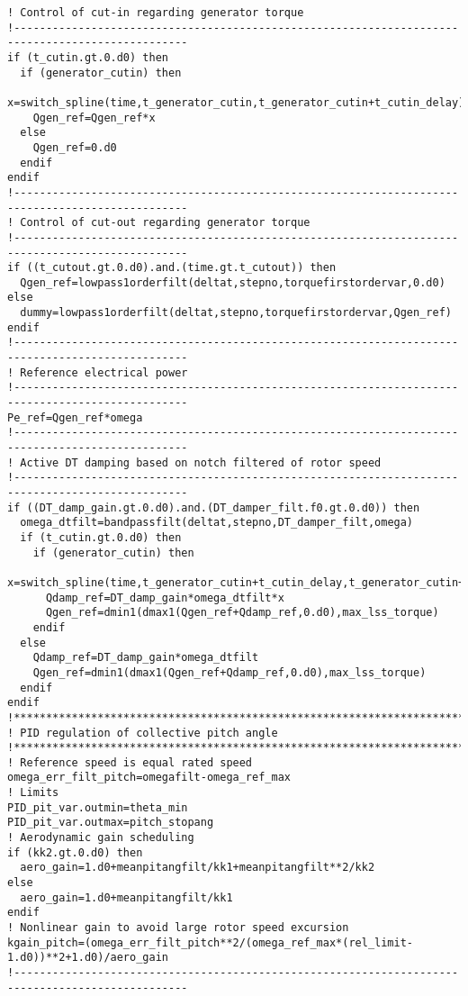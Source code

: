 {\begin{verbatim}
! Control of cut-in regarding generator torque
!-------------------------------------------------------------------------------------------------
if (t_cutin.gt.0.d0) then
  if (generator_cutin) then
    x=switch_spline(time,t_generator_cutin,t_generator_cutin+t_cutin_delay)
    Qgen_ref=Qgen_ref*x
  else
    Qgen_ref=0.d0
  endif
endif
!-------------------------------------------------------------------------------------------------
! Control of cut-out regarding generator torque
!-------------------------------------------------------------------------------------------------
if ((t_cutout.gt.0.d0).and.(time.gt.t_cutout)) then
  Qgen_ref=lowpass1orderfilt(deltat,stepno,torquefirstordervar,0.d0)
else
  dummy=lowpass1orderfilt(deltat,stepno,torquefirstordervar,Qgen_ref)
endif
!-------------------------------------------------------------------------------------------------
! Reference electrical power
!-------------------------------------------------------------------------------------------------
Pe_ref=Qgen_ref*omega
!-------------------------------------------------------------------------------------------------
! Active DT damping based on notch filtered of rotor speed
!-------------------------------------------------------------------------------------------------
if ((DT_damp_gain.gt.0.d0).and.(DT_damper_filt.f0.gt.0.d0)) then
  omega_dtfilt=bandpassfilt(deltat,stepno,DT_damper_filt,omega)
  if (t_cutin.gt.0.d0) then
    if (generator_cutin) then
      x=switch_spline(time,t_generator_cutin+t_cutin_delay,t_generator_cutin+2.d0*t_cutin_delay)
      Qdamp_ref=DT_damp_gain*omega_dtfilt*x
      Qgen_ref=dmin1(dmax1(Qgen_ref+Qdamp_ref,0.d0),max_lss_torque)
    endif
  else
    Qdamp_ref=DT_damp_gain*omega_dtfilt
    Qgen_ref=dmin1(dmax1(Qgen_ref+Qdamp_ref,0.d0),max_lss_torque)
  endif
endif
!**************************************************************************************************
! PID regulation of collective pitch angle
!**************************************************************************************************
! Reference speed is equal rated speed
omega_err_filt_pitch=omegafilt-omega_ref_max
! Limits
PID_pit_var.outmin=theta_min
PID_pit_var.outmax=pitch_stopang
! Aerodynamic gain scheduling
if (kk2.gt.0.d0) then
  aero_gain=1.d0+meanpitangfilt/kk1+meanpitangfilt**2/kk2
else
  aero_gain=1.d0+meanpitangfilt/kk1
endif
! Nonlinear gain to avoid large rotor speed excursion
kgain_pitch=(omega_err_filt_pitch**2/(omega_ref_max*(rel_limit-1.d0))**2+1.d0)/aero_gain
!-------------------------------------------------------------------------------------------------

\end{verbatim}}
